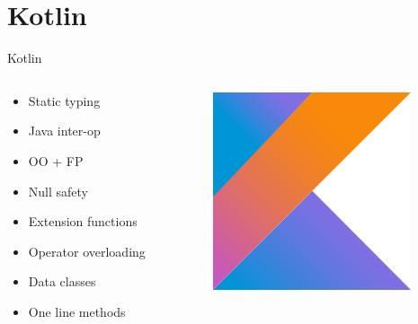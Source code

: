 \documentclass[aspectratio=169]{beamer}
\begin{document}
\section{Kotlin}

\begin{frame}{Kotlin}
\begin{columns}
	\begin{column}{0.5\textwidth}
		\begin{itemize}
			\item Static typing
			\item Java inter-op
			\item OO + FP
			\item Null safety
			\item Extension functions
			\item Operator overloading
			\item Data classes
			\item One line methods
		\end{itemize}
	\end{column}
	\begin{column}{0.5\textwidth}  %
		\begin{figure}
			\centering
			\includegraphics[width=0.7\linewidth]{Images/kotlin}
		\end{figure}
	\end{column}
\end{columns}
\end{frame}
\end{document}
